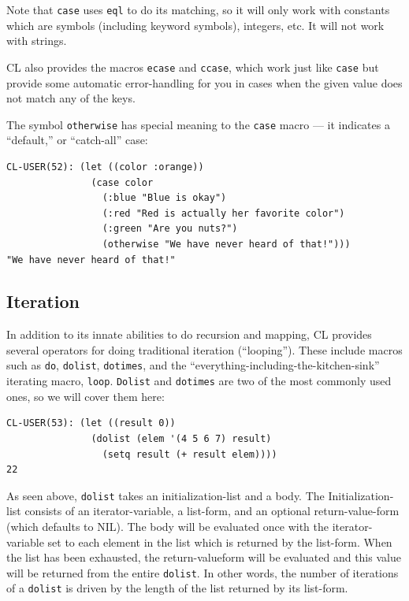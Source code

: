Note that \texttt{case} uses \texttt{eql} to do its matching, so it will only work with constants which are
symbols (including keyword symbols), integers, etc. It will not work with strings.

CL also provides the macros \texttt{ecase} and \texttt{ccase}, which work just like \texttt{case} but provide
some automatic error-handling for you in cases when the given value does not match any
of the keys.

The symbol \texttt{otherwise} has special meaning to the \texttt{case} macro --- it indicates a ``default,''
or ``catch-all'' case:

\begin{verbatim}
CL-USER(52): (let ((color :orange))
               (case color
                 (:blue "Blue is okay")
                 (:red "Red is actually her favorite color")
                 (:green "Are you nuts?")
                 (otherwise "We have never heard of that!")))
"We have never heard of that!"
\end{verbatim}

\subsection{Iteration}

In addition to its innate abilities to do recursion and mapping, CL provides several operators for doing traditional iteration (``looping''). These include macros such as \texttt{do}, \texttt{dolist},
\texttt{dotimes}, and the ``everything-including-the-kitchen-sink'' iterating macro, \texttt{loop}. \texttt{Dolist}
and \texttt{dotimes} are two of the most commonly used ones, so we will cover them here:

\begin{verbatim}
CL-USER(53): (let ((result 0))
               (dolist (elem '(4 5 6 7) result)
                 (setq result (+ result elem))))
22
\end{verbatim}

As seen above, \texttt{dolist} takes an initialization-list and a body. The Initialization-list consists
of an iterator-variable, a list-form, and an optional return-value-form (which defaults to
NIL). The body will be evaluated once with the iterator-variable set to each element in the
list which is returned by the list-form. When the list has been exhausted, the return-valueform will be evaluated and this value will be returned from the entire \texttt{dolist}. In other
words, the number of iterations of a \texttt{dolist} is driven by the length of the list returned by
its list-form.

